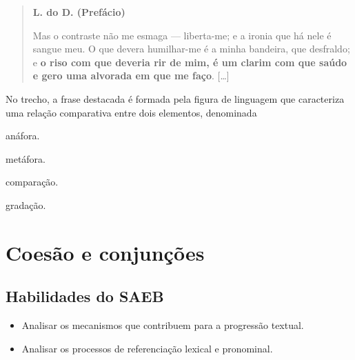 \begin{quote}\enlargethispage{2\baselineskip}
\textbf{L. do D. (Prefácio)}


Mas o contraste não me esmaga --- liberta-me; e a ironia que há nele é
sangue meu. O que devera humilhar-me é a minha bandeira, que desfraldo;
e \textbf{o riso com que deveria rir de mim, é um clarim com que saúdo e
gero uma alvorada em que me faço}. {[}\ldots{}{]}

\end{quote}

No trecho, a frase destacada é formada pela figura de linguagem que
caracteriza uma relação comparativa entre dois elementos, denominada

\begin{multicols}{2}
\begin{escolha}
\item anáfora.

\item metáfora.

\item comparação.

\item gradação.
\end{escolha}
\end{multicols}

\pagebreak

\chapter{Coesão e conjunções}

\section{Habilidades do SAEB}

\begin{itemize}
\item Analisar os mecanismos que contribuem para a progressão textual.

\item Analisar os processos de referenciação lexical e pronominal.
\end{itemize}

